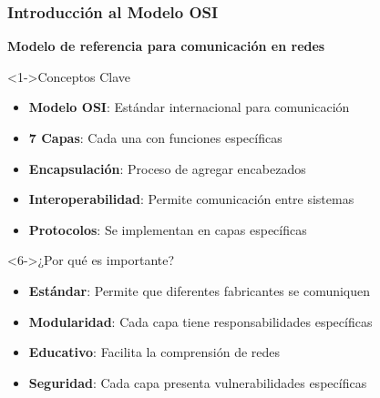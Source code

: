 \documentclass[aspectratio=169]{beamer}
\begin{document}
            \begin{frame}
            \frametitle{Introducción al Modelo OSI}
            
            \begin{center}
            \Large \textbf{Modelo de referencia para comunicación en redes}
            \end{center}
            
            \begin{block}<1->{Conceptos Clave}
            \begin{itemize}
            \item<1-> \textbf{Modelo OSI}: Estándar internacional para comunicación
            \item<2-> \textbf{7 Capas}: Cada una con funciones específicas
            \item<3-> \textbf{Encapsulación}: Proceso de agregar encabezados
            \item<4-> \textbf{Interoperabilidad}: Permite comunicación entre sistemas
            \item<5-> \textbf{Protocolos}: Se implementan en capas específicas
            \end{itemize}
            \end{block}
            
            \begin{block}<6->{¿Por qué es importante?}
            \begin{itemize}
            \item<6-> \textbf{Estándar}: Permite que diferentes fabricantes se comuniquen
            \item<7-> \textbf{Modularidad}: Cada capa tiene responsabilidades específicas
            \item<8-> \textbf{Educativo}: Facilita la comprensión de redes
            \item<9-> \textbf{Seguridad}: Cada capa presenta vulnerabilidades específicas
            \end{itemize}
            \end{block}
            \end{frame}
            
            
\end{document}

